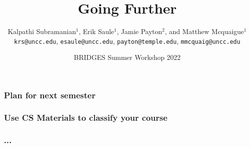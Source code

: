 \documentclass[aspectratio=169]{beamer}
\title{Going Further}
\subtitle{}
\author{Kalpathi Subramanian$^1$, Erik Saule$^1$, Jamie Payton$^2$, and Matthew Mcquaigue$^1$ \\\texttt{krs@uncc.edu}, \texttt{esaule@uncc.edu}, \texttt{payton@temple.edu}, \texttt{mmcquaig@uncc.edu}}
\institute{$^1$The University of North Carolina at Charlotte\\$^2$Temple University}
\date{BRIDGES Summer Workshop 2022}
\begin{document}
\begin{frame}
\titlepage
\end{frame}




\begin{frame}
\frametitle{Plan for next semester}
\end{frame}

\begin{frame}
\frametitle{Use CS Materials to classify your course}
\end{frame}

\begin{frame}
\frametitle{...}
\end{frame}
\end{document}
